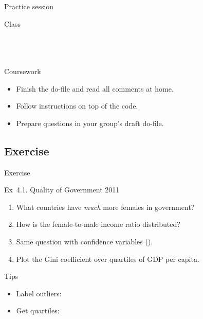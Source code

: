 \documentclass[t]{beamer}
\begin{document}
	\begin{frame}[t]{Practice session}

    \begin{block}{Class}
      \\
      \\
      
			\\
			\\    
    \end{block}

    \begin{alertblock}{Coursework}
      \begin{itemize}
	       \item Finish the do-file and read all comments at home.
	       \item Follow instructions on top of the code.
	       \item Prepare questions in your group's draft do-file.
      \end{itemize}
    \end{alertblock}
    		
	\end{frame}
	
  \subsection{Exercise}
  
  \begin{frame}{Exercise}

    \begin{exampleblock}{Ex~4.1. Quality of Government 2011}
      \begin{enumerate}
        \item What countries have \emph{much} more females in government?
        \item How is the female-to-male income ratio distributed?
        \item Same question with confidence variables ().
				\item Plot the Gini coefficient over quartiles of GDP per capita.
      \end{enumerate}
    \end{exampleblock}
		
    \begin{block}{Tips}
      \begin{itemize}
        \item Label outliers: 
        \item Get quartiles: 
      \end{itemize}
    \end{block}

  \end{frame}
	
\end{document}
